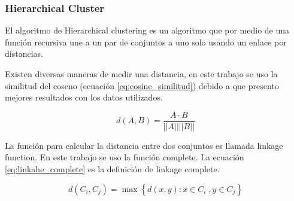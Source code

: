 \subsubsection{Hierarchical Cluster}

El algoritmo de Hierarchical clustering es un algoritmo que por medio de una función recursiva une a un par de conjuntos a uno solo usando un enlace por distancias.

Existen diversas maneras de medir una distancia, en este trabajo se uso la similitud del coseno (ecuación \ref{eq:cosine_similitud}) debido a que presento mejores resultados con los datos utilizados.

\begin{equation}
    d(A,B) = \frac{A\cdot B}{||A|| ||B||}
    \label{eq:cosine_similitud}
\end{equation}

La función para calcular la distancia entre dos conjuntos es llamada linkage function. En este trabajo se uso la función complete. La ecuación \ref{eq:linkahe_complete} es la definición de linkage complete.

\begin{equation}
    d(C_i,C_j) = \max \left\lbrace d(x,y) : x\in C_i\;, y\in C_j \right\rbrace \label{eq:linkahe_complete}
\end{equation}



